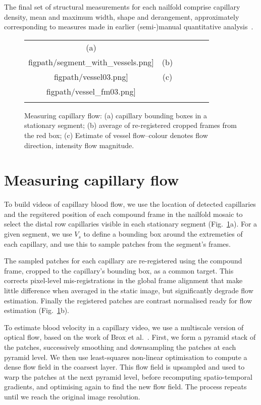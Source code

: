 \documentclass[runningheads,a4paper]{llncs}
\def\figpath{./figs}
\newcommand{\fref}[1]{Fig.~\ref{#1}}
\def\figpath{./figs}
\begin{document}
The final set of structural measurements for each nailfold comprise capillary density, mean and maximum width, shape and derangement, approximately corresponding to measures made in earlier (semi-)manual quantitative analysis~\cite{Murray_etal_AR09}.
%
\begin{figure}[t]
\centering
\begin{tabular}{@{}c c  c c c c@{}}
(a)&
\texttt{[image: \\figpath/segment\_with\_vessels.png]} &
(b)&
\texttt{[image: \\figpath/vessel03.png]} &
(c)&
\texttt{[image: \\figpath/vessel\_fm03.png]} \\
\noalign{\smallskip}
\end{tabular}
%
\caption{Measuring capillary flow: %
(a) capillary bounding boxes in a stationary segment; %
(b) average of re-registered cropped frames from the red box\protect\footnotemark[1]; %
(c) Estimate of vessel flow--colour denotes flow direction, intensity flow magnitude. %
}
\label{f:vessel_flow}
\end{figure}
%
\section{Measuring capillary flow}
\label{s:flow}
%
To build videos of capillary blood flow, we use the location of detected capillaries and the regsitered position of each compound frame in the nailfold mosaic to select the distal row capillaries visible in each stationary segment (\fref{f:vessel_flow}a). For a given segment, we use $V_s$ to define a bounding box around the extremeties of each capillary, and use this to sample patches from the segment's frames.

The sampled patches for each capillary are re-registered using the compound frame, cropped to the capillary's bounding box, as a common target. This corrects pixel-level mis-registrations in the global frame alignment that make little difference when averaged in the static image, but significantly degrade flow estimation. Finally the registered patches are contrast normalised ready for flow estimation (\fref{f:vessel_flow}b).

To estimate blood velocity in a capillary video, we use a multiscale version of optical flow, based on the work of Brox et al.~\cite{BroxECCV04}. First, we form a pyramid stack of the patches, successively smoothing and downsampling the patches at each pyramid level. We then use least-squares non-linear optimisation to compute a dense flow field in the coarsest layer. This flow field is upsampled and used to warp the patches at the next pyramid level, before recomputing spatio-temporal gradients, and optimising again to find the new flow field. The process repeats until we reach the original image resolution.
\end{document}
